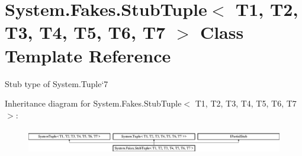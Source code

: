 \hypertarget{class_system_1_1_fakes_1_1_stub_tuple_3_01_t1_00_01_t2_00_01_t3_00_01_t4_00_01_t5_00_01_t6_00_01_t7_01_4}{\section{System.\-Fakes.\-Stub\-Tuple$<$ T1, T2, T3, T4, T5, T6, T7 $>$ Class Template Reference}
\label{class_system_1_1_fakes_1_1_stub_tuple_3_01_t1_00_01_t2_00_01_t3_00_01_t4_00_01_t5_00_01_t6_00_01_t7_01_4}
}


Stub type of System.\-Tuple`7 


Inheritance diagram for System.\-Fakes.\-Stub\-Tuple$<$ T1, T2, T3, T4, T5, T6, T7 $>$\-:\begin{figure}[H]
\begin{center}
\leavevmode
\includegraphics[height=1.117764cm]{class_system_1_1_fakes_1_1_stub_tuple_3_01_t1_00_01_t2_00_01_t3_00_01_t4_00_01_t5_00_01_t6_00_01_t7_01_4}
\end{center}
\end{figure}
